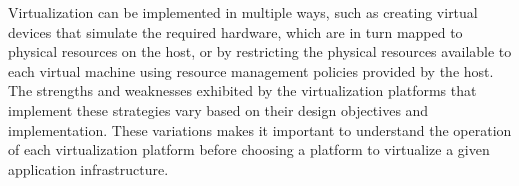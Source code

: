 Virtualization can be implemented in multiple ways, such as creating virtual devices that simulate the required hardware, which are in turn mapped to physical resources on the host, or by restricting the physical resources available to each virtual machine using resource  management policies provided by the host. The strengths and weaknesses exhibited by the virtualization platforms that implement these strategies vary based on their design objectives and implementation. These variations makes it important to understand the operation of each virtualization platform before choosing a platform to virtualize a given application infrastructure.



%
%
%
